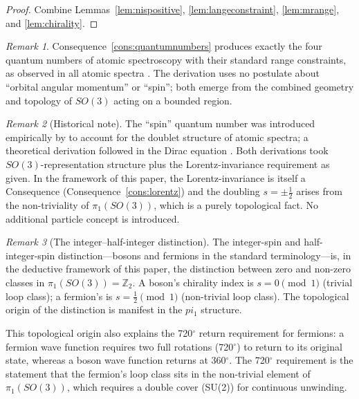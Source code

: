 \documentclass[11pt,twocolumn,a4paper]{article}
\theoremstyle{axiomstyle}
\theoremstyle{conseqstyle}
\theoremstyle{definition}
\theoremstyle{remark}
\newtheorem*{remark}{Remark}
\newcommand{\Integer}{\mathbb{Z}}
\begin{document}
\begin{proof}
Combine Lemmas~\ref{lem:nispositive}, \ref{lem:langeconstraint}, \ref{lem:mrange}, and \ref{lem:chirality}.
\end{proof}

\begin{remark}
Consequence~\ref{cons:quantumnumbers} produces exactly the four quantum numbers of atomic spectroscopy with their standard range constraints, as observed in all atomic spectra \citep{herzberg1944,nistasd}. The derivation uses no postulate about ``orbital angular momentum'' or ``spin''; both emerge from the combined geometry and topology of $SO(3)$ acting on a bounded region.
\end{remark}

\begin{remark}[Historical note]
The ``spin'' quantum number was introduced empirically by \citet{uhlenbeckgoudsmit1925} to account for the doublet structure of atomic spectra; a theoretical derivation followed in the Dirac equation \citep{dirac1928}. Both derivations took $SO(3)$-representation structure plus the Lorentz-invariance requirement as given. In the framework of this paper, the Lorentz-invariance is itself a Consequence (Consequence~\ref{cons:lorentz}) and the doubling $s=\pm\tfrac{1}{2}$ arises from the non-triviality of $\pi_{1}(SO(3))$, which is a purely topological fact. No additional particle concept is introduced.
\end{remark}

\begin{remark}[The integer--half-integer distinction]
The integer-spin and half-integer-spin distinction---bosons and fermions in the standard terminology---is, in the deductive framework of this paper, the distinction between zero and non-zero classes in $\pi_{1}(SO(3))=\Integer_{2}$. A boson's chirality index is $s=0\pmod 1$ (trivial loop class); a fermion's is $s=\tfrac{1}{2}\pmod 1$ (non-trivial loop class). The topological origin of the distinction is manifest in the $pi_{1}$ structure.

This topological origin also explains the 720$^{\circ}$ return requirement for fermions: a fermion wave function requires two full rotations (720$^{\circ}$) to return to its original state, whereas a boson wave function returns at 360$^{\circ}$. The 720$^{\circ}$ requirement is the statement that the fermion's loop class sits in the non-trivial element of $\pi_{1}(SO(3))$, which requires a double cover (SU(2)) for continuous unwinding.
\end{remark}
\end{document}

